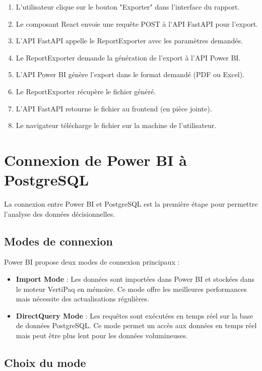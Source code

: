 \begin{enumerate}
    \item L'utilisateur clique sur le bouton "Exporter" dans l'interface du rapport.
    \item Le composant React envoie une requête POST à l'API FastAPI pour l'export.
    \item L'API FastAPI appelle le ReportExporter avec les paramètres demandés.
    \item Le ReportExporter demande la génération de l'export à l'API Power BI.
    \item L'API Power BI génère l'export dans le format demandé (PDF ou Excel).
    \item Le ReportExporter récupère le fichier généré.
    \item L'API FastAPI retourne le fichier au frontend (en pièce jointe).
    \item Le navigateur télécharge le fichier sur la machine de l'utilisateur.
\end{enumerate}

\section{Connexion de Power BI à PostgreSQL}
\label{sec:sprint7-connexion}

La connexion entre Power BI et PostgreSQL est la première étape pour permettre l'analyse des données décisionnelles.

\subsection{Modes de connexion}

Power BI propose deux modes de connexion principaux :

\begin{itemize}
    \item \textbf{Import Mode} : Les données sont importées dans Power BI et stockées dans le moteur VertiPaq en mémoire. Ce mode offre les meilleures performances mais nécessite des actualisations régulières.
    \item \textbf{DirectQuery Mode} : Les requêtes sont exécutées en temps réel sur la base de données PostgreSQL. Ce mode permet un accès aux données en temps réel mais peut être plus lent pour les données volumineuses.
\end{itemize}

\subsection{Choix du mode}


